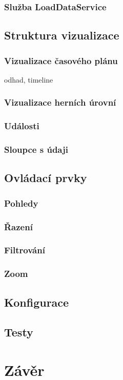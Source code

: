 \documentclass[
  digital, %
  oneside, %
  table,   %
  nolof,     %
  nolot,     %
]{fithesis3}
\begin{document}
\subsection{Služba LoadDataService}

\section{Struktura vizualizace}
\subsection{Vizualizace časového plánu}
odhad, timeline
\subsection{Vizualizace herních úrovní}
\subsection{Události}
\subsection{Sloupce s údaji}

\section{Ovládací prvky}
\subsection{Pohledy}
\subsection{Řazení}
\subsection{Filtrování}
\subsection{Zoom}

\section{Konfigurace}

\section{Testy}

\chapter{Závěr}

\printbibliography
\end{document}
